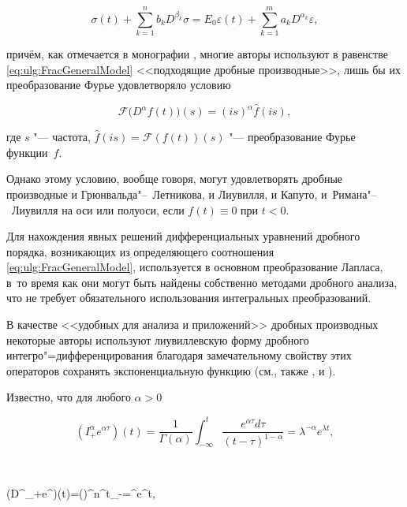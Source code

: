 \begin{equation}\label{eq:ulg:FracGeneralModel}

\sigma\left(t\right)+\sum^{n}_{k=1}b_{k}D^{\beta_{k}}\sigma=E_{0}\varepsilon\left(t\right)+\sum^{m}_{k=1}a_{k}D^{\alpha_{k}}\varepsilon,

\end{equation}

причём, как отмечается в монографии \cite[с.~443]{ulg:bib:K-S-T}, многие авторы используют в равенстве \eqref{eq:ulg:FracGeneralModel} <<подходящие дробные производные>>, лишь бы их преобразование Фурье удовлетворяло условию

$$

\mathcal{F}\bigl(D^{\alpha}f(t)\bigr)(s)=(is)^{\alpha}\hat{f}(is),

$$

где $s$ "---  частота, $\hat{f}(is)=\mathcal{F}\left(f(t)\right)(s)$ "---  преобразование Фурье функции~$f$. 

Однако этому условию, вообще говоря, могут удовлетворять дробные производные и Грюнвальда"--~Летникова, и Лиувилля, и Капуто, и~Римана"--~Лиувилля на оси или полуоси, если $f(t)\equiv 0$ при $t<0$. 

Для нахождения явных решений дифференциальных уравнений дробного порядка, возникающих из определяющего соотношения \eqref{eq:ulg:FracGeneralModel}, используется в основном преобразование Лапласа, в~то время как они могут быть найдены собственно методами дробного анализа, что не требует обязательного использования интегральных преобразований. 



В качестве <<удобных для анализа и приложений>> дробных производных некоторые авторы используют лиувиллевскую форму дробного интегро"=дифференцирования благодаря замечательному свойству этих операторов  сохранять экспоненциальную функцию \cite[с.~2]{ulg:bib:Lewandowski} (см., также \cite[с.~81]{ulg:bib:K-S-T}, \cite[с.~87]{ulg:bib:S-K-M} и \cite[с.~311]{ulg:bib:Podlubny1999}). 

Известно, что для любого $\alpha>0$

$$

\left(I^{\alpha}_{+}e^{\alpha\tau}\right)(t)=\frac{1}{\Gamma(\alpha)}\int ^{t}_{-\infty}\frac{e^{\alpha\tau}d\tau}{(t-\tau)^{1-\alpha}}=\lambda^{-\alpha}e^{\lambda t},

$$

$$

\left(D^{\alpha}_{+}e^{\alpha\tau}\right)(t)=\Bigl(\Bigr)^{n}\int ^{t}_{-\infty}=\lambda^{\alpha}e^{\lambda t},

